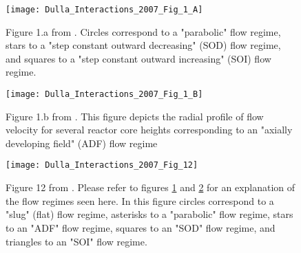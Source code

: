 \documentclass[review]{elsarticle}
\begin{document}
\begin{figure}[h]
   \centering
   \texttt{[image: Dulla\_Interactions\_2007\_Fig\_1\_A]}
   \caption{Figure 1.a from \cite{dulla_interactions_2007}. Circles correspond
    to a "parabolic" flow regime, stars to a "step constant outward decreasing"
    (SOD) flow regime, and squares to a "step constant outward increasing" (SOI)
    flow regime.} 
   \label{fig:dulla_flow_map}
\end{figure}

\begin{figure}[h]
   \centering
   \texttt{[image: Dulla\_Interactions\_2007\_Fig\_1\_B]}
   \caption{Figure 1.b from \cite{dulla_interactions_2007}. This figure depicts
   the radial profile of flow velocity for several reactor core heights
   corresponding to an "axially developing field" (ADF) flow regime} 
   \label{fig:dulla_flow_adf}
\end{figure}

\begin{figure}[h]
   \centering
   \texttt{[image: Dulla\_Interactions\_2007\_Fig\_12]}
   \caption{Figure 12 from \cite{dulla_interactions_2007}. Please refer to
   figures \ref{fig:dulla_flow_map} and \ref{fig:dulla_flow_adf} for an
   explanation of the flow regimes seen here. In this figure circles correspond
   to a "slug" (flat) flow regime, asterisks to a "parabolic" flow regime, stars to an
   "ADF" flow regime, squares to an "SOD" flow regime, and triangles to an
   "SOI" flow regime.} 
   \label{fig:dulla_flow_regimes}
\end{figure}
\end{document}
